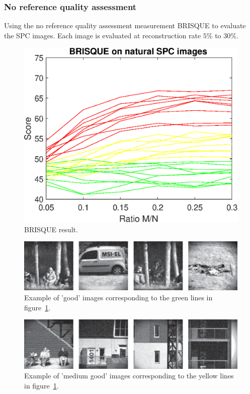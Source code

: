 \subsubsection{No reference quality assessment}
Using the no reference quality assessment measurement BRISQUE to evaluate the SPC images. Each image is evaluated at reconstruction rate $5\%$ to $30\%$.

\begin{figure}[H]
    \centering
    \includegraphics[width = 0.7\linewidth]{result/SPC_NRQA/brisque_spc.eps}
    \caption{BRISQUE result.}
    \label{fig:brisque_plot}
\end{figure}

\begin{figure}[H]
    \centering
    \includegraphics[width = 1\linewidth]{result/SPC_NRQA/good.eps}
    \caption{Example of 'good' images corresponding to the green lines in figure~\ref{fig:brisque_plot}.}
    \label{fig:good_plot}
\end{figure}

\begin{figure}[H]
    \centering
    \includegraphics[width = 1\linewidth]{result/SPC_NRQA/half.eps}
    \caption{Example of 'medium good' images corresponding to the yellow lines in figure~\ref{fig:brisque_plot}.}
    \label{fig:half_plot}
\end{figure}

